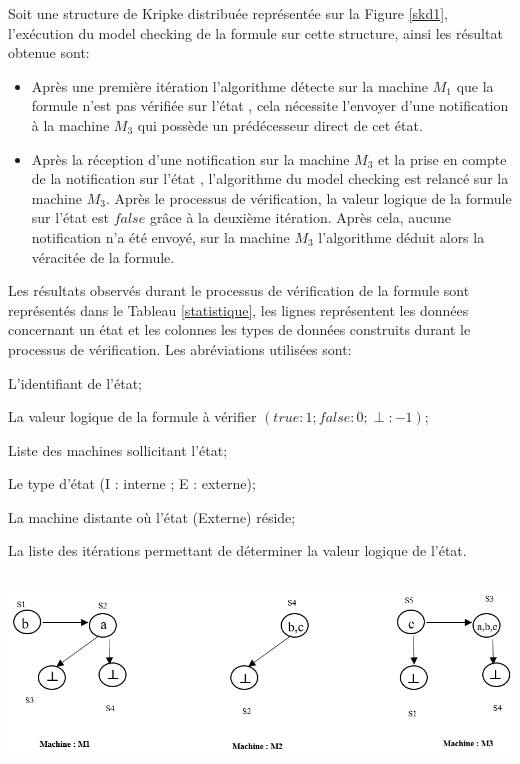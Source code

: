 \begin{Exemple}
   Soit une structure de Kripke distribuée représentée sur la Figure \ref{skd1}, l'exécution du model checking de la formule  sur cette structure, ainsi les résultat obtenue sont:
   \begin{itemize}
   	\item Après une première itération l'algorithme détecte sur la machine $M_1$ que la formule n’est pas vérifiée sur l’état , cela nécessite l'envoyer d'une notification à la machine $M_3$ qui possède un prédécesseur direct de cet état.
   	\item Après la réception d'une notification sur la machine $M_3$ et la prise en compte de la notification sur l'état , l'algorithme du model checking est relancé sur la machine $M_3$. Après le processus de vérification, la valeur logique de la formule sur l’état  est $false$ grâce à la deuxième itération. Après cela, aucune notification n'a été envoyé, sur la machine $M_3$ l'algorithme déduit alors la véracitée de la formule.
   \end{itemize}    
Les résultats observés durant le processus de vérification de la formule  sont représentés dans le Tableau \ref{statistique}, les lignes représentent les données concernant un état et les colonnes les types de données construits durant le processus de vérification. Les abréviations utilisées sont:
\begin{description}[,leftmargin=2cm,labelindent=1em]
	\item[Id   :] L'identifiant de l’état;
	\item[VL   :] La valeur logique de la formule à vérifier $(true : 1 ; false : 0 ; \perp : -1)$;
	\item [Sub :] Liste des machines sollicitant l'état;
	\item[T    :] Le type d’état (I : interne ; E : externe);
	\item[Site :] La machine distante o\`{u} l'état (Externe) réside;
	\item[I    :] La liste des itérations permettant de déterminer la valeur logique de l'état.	
\end{description}
   \centering
	\includegraphics[height=2in]{img/skd1.png}	
	\label{skd1}
\end{Exemple}
